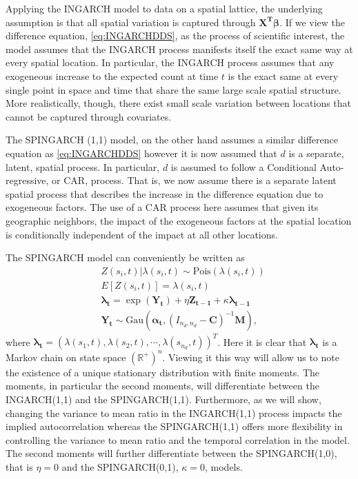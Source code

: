 \documentclass[11pt]{isuthesis}
\begin{document}
Applying the INGARCH model to data on a spatial lattice, the underlying assumption is that all spatial variation is captured through $\boldsymbol{X^T}\boldsymbol{\beta}$. If we view the difference equation, \eqref{eq:INGARCHDDS}, as the process of scientific interest, the model assumes that the INGARCH process manifests itself the exact same way at every spatial location.  In particular, the INGARCH process assumes that any exogeneous increase to the expected count at time $t$ is the exact same at every single point in space and time that share the same large scale spatial structure.   More realistically, though, there exist small scale variation between locations that cannot be captured through covariates.  

The SPINGARCH (1,1) model, on the other hand assumes a similar difference equation as \eqref{eq:INGARCHDDS} however it is now assumed that $d$ is a separate, latent, spatial process.  In particular, $d$ is assumed to follow a Conditional Auto-regressive, or CAR, process.  That is, we now assume there is a separate latent spatial process that describes the increase in the difference equation due to exogeneous factors. The use of a CAR process here assumes that given its geographic neighbors, the impact of the exogeneous factors at the spatial location is conditionally independent of the impact at all other locations.

The SPINGARCH model can conveniently be written as
\begin{align}
	& Z(s_i,t)|\lambda(s_i,t) \sim \mbox{Pois}(\lambda(s_i,t)) \label{eq:timeseries2} \\
	& E[Z(s_i,t)]=\lambda(s_i,t)\\
	& \boldsymbol{\lambda_t} = \exp(\boldsymbol{Y_t})+\eta \boldsymbol{Z_{t-1}}+\kappa \boldsymbol{\lambda_{t-1}}\\
	& \boldsymbol{Y_t} \sim \mbox{Gau}\textit{} (\boldsymbol{\alpha_t},(I_{{n_d},{n_d}}-\boldsymbol{C})^{-1}\boldsymbol{M}),
\end{align}
where $\boldsymbol{\lambda_t}=\left(\lambda(s_1,t),\lambda(s_2,t),\cdots,\lambda(s_{n_d},t)\right)^T$.  Here it is clear that $\boldsymbol{\lambda_t}$ is a Markov chain on state space $(\mathbb{R}^{+})^n$.  Viewing it this way will allow us to note the existence of a unique stationary distribution with finite moments.  The moments, in particular the second moments, will differentiate between the INGARCH(1,1) and the SPINGARCH(1,1).  Furthermore, as we will show, changing the variance to mean ratio in the INGARCH(1,1) process impacts the implied autocorrelation whereas the SPINGARCH(1,1) offers more flexibility in controlling the variance to mean ratio and the temporal correlation in the model.  The second moments will further differentiate between the SPINGARCH(1,0), that is $\eta=0$ and the SPINGARCH(0,1), $\kappa=0$, models.  
\end{document}
